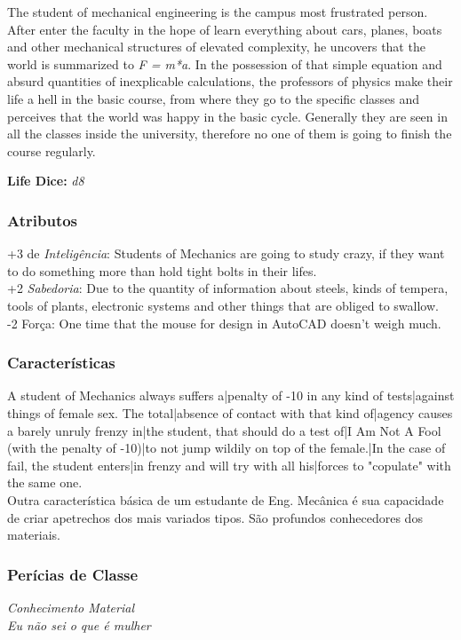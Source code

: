 \documentclass[ letterpaper,12pt]{article}
\begin{document}
The student of mechanical engineering is the campus most frustrated person. After enter the faculty in the hope of learn everything about cars, planes, boats and other mechanical structures of elevated complexity, he uncovers that the world is summarized to {\it F = m*a}. In the possession of that simple equation and absurd quantities of inexplicable calculations, the professors of physics make their life a hell in the basic course, from where they go to the specific classes and perceives that the world was happy in the basic cycle. Generally they are seen in all the classes inside the university, therefore no one of them is going to finish the course regularly. 

{\bf Life Dice: } {\it d8}

\subsubsection{Atributos}
+3 de {\it Inteligência}: Students  of Mechanics are going to study crazy, if they want to  do something more than  hold tight bolts in their lifes.\\
+2 {\it Sabedoria}: Due  to the quantity of information about steels,  kinds  of   tempera,   tools  of plants,  electronic   systems  and  other things that  are  obliged to swallow.\\
-2 Força: One  time that the  mouse  for  design  in  AutoCAD doesn't weigh much.\\


\subsubsection{Características}
A  student  of Mechanics always suffers a|penalty of  -10  in  any  kind  of  tests|against things of female sex.  The  total|absence  of  contact  with  that  kind of|agency causes a  barely unruly  frenzy in|the  student,  that  should  do a test of|I Am Not A Fool (with the penalty of -10)|to not jump wildily on top of the female.|In the  case  of fail, the student enters|in  frenzy  and  will  try  with  all his|forces to "copulate" with the same one.\\
Outra característica básica de um estudante de Eng. Mecânica é sua capacidade de criar apetrechos dos mais variados tipos. São profundos conhecedores dos materiais.\\

\subsubsection{Perícias de Classe}
{\it Conhecimento Material\\
Eu não sei o que é mulher}\\
\end{document}
